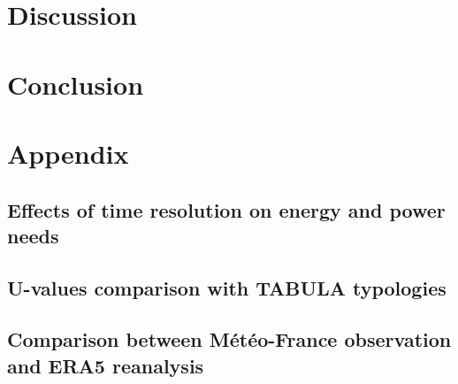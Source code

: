 \documentclass[11pt]{article}
\begin{document}
    

\clearpage
\section{Discussion}
\label{sec:disc}

\clearpage
\section{Conclusion}
\label{sec:conclu}



\clearpage
\printbibliography


\appendix

\clearpage
\section{Appendix} %
\label{sec:appendix}

    \subsection{Effects of time resolution on energy and power needs} %
    \label{sub:effects_of_time_resolution_on_energy_and_power_needs}
    

    \subsection{U-values comparison with TABULA typologies} %
    \label{sub:u_values_comparison_with_tabula_typologies}
    

    \subsection{Comparison between Météo-France observation and ERA5 reanalysis} %
    \label{sub:comparison_between_mf_observation_and_era5_reanalysis_data}
    
\end{document}

